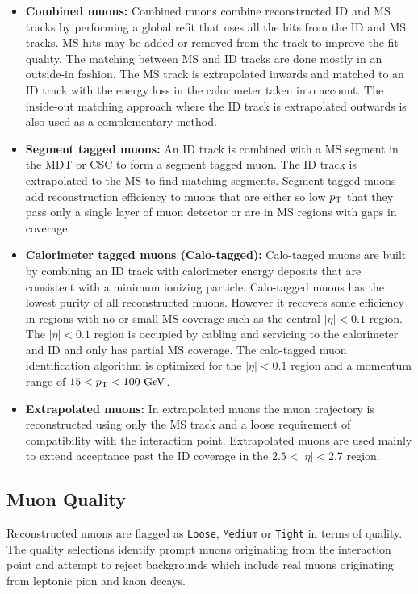 \begin{itemize}
\item[] {\bf Combined muons:}  Combined muons combine reconstructed ID and MS tracks by performing a global refit that uses all the hits from the ID and MS tracks.  MS hits may be added or removed from the track to improve the fit quality.  The matching between MS and ID tracks are done mostly in an outside-in fashion.  The MS track is extrapolated inwards and matched to an ID track with the energy loss in the calorimeter taken into account.  The inside-out matching approach where the ID track is extrapolated outwards is also used as a complementary method. 
\item[] {\bf Segment tagged muons:}  An ID track is combined with a MS segment in the MDT or CSC to form a segment tagged muon.  The ID track is extrapolated to the MS to find matching segments.  Segment tagged muons add reconstruction efficiency to muons that are either so low $p_{\mathrm{T}}$ that they pass only a single layer of muon detector or are in MS regions with gaps in coverage. 
\item[] {\bf Calorimeter tagged muons (Calo-tagged):}  Calo-tagged muons are built by combining an ID track with calorimeter energy deposits that are consistent with a minimum ionizing particle.  Calo-tagged muons has the lowest purity of all reconstructed muons.  However it recovers some efficiency in regions with no or small MS coverage such as the central $|\eta| < 0.1$ region.  The $|\eta| < 0.1$ region is occupied by cabling and servicing to the calorimeter and ID and only has partial MS coverage.  The calo-tagged muon identification algorithm is optimized for the $|\eta| < 0.1$ region and a momentum range of $15 < \pt < 100 \gev$.
\item[] {\bf Extrapolated muons:}  In extrapolated muons the muon trajectory is reconstructed using only the MS track and a loose requirement of compatibility with the interaction point.  Extrapolated muons are used mainly to extend acceptance past the ID coverage in the $2.5 < |\eta| < 2.7$ region.
\end{itemize}

\subsection{Muon Quality}
\label{sec:reco:MuonQuality}

\indent Reconstructed muons are flagged as {\tt Loose}, {\tt Medium} or {\tt Tight} in terms of quality.  The quality selections identify prompt muons originating from the interaction point and attempt to reject backgrounds which include real muons originating from leptonic pion and kaon decays. \\

